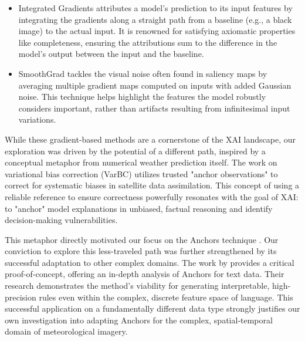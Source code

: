 \begin{itemize}
    \item Integrated Gradients attributes a model's prediction to its input features by integrating the gradients along a straight path from a baseline (e.g., a black image) to the actual input. It is renowned for satisfying axiomatic properties like completeness, ensuring the attributions sum to the difference in the model's output between the input and the baseline.
    \item SmoothGrad tackles the visual noise often found in saliency maps by averaging multiple gradient maps computed on inputs with added Gaussian noise. This technique helps highlight the features the model robustly considers important, rather than artifacts resulting from infinitesimal input variations.
\end{itemize}

While these gradient-based methods are a cornerstone of the XAI landscape, our exploration was driven by the potential of a different path, inspired by a conceptual metaphor from numerical weather prediction itself. The work on variational bias correction (VarBC) \cite{varBC-francis} utilizes trusted "anchor observations" to correct for systematic biases in satellite data assimilation. This concept of using a reliable reference to ensure correctness powerfully resonates with the goal of XAI: to "anchor" model explanations in unbiased, factual reasoning and identify decision-making vulnerabilities.

This metaphor directly motivated our focus on the Anchors technique \cite{anchors-ribeiro}. Our conviction to explore this less-traveled path was further strengthened by its successful adaptation to other complex domains. The work by \cite{anchors-sea-of-words-lopardo} provides a critical proof-of-concept, offering an in-depth analysis of Anchors for text data. Their research demonstrates the method's viability for generating interpretable, high-precision rules even within the complex, discrete feature space of language. This successful application on a fundamentally different data type strongly justifies our own investigation into adapting Anchors for the complex, spatial-temporal domain of meteorological imagery.


